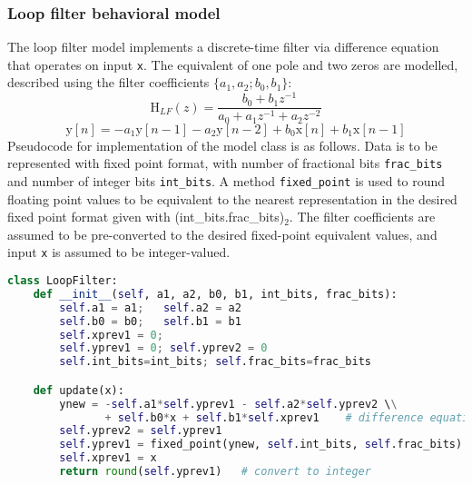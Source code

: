 \subsubsection{Loop filter behavioral model}
The loop filter model implements a discrete-time filter via difference equation that operates on input \texttt{x}. The equivalent of one pole and two zeros are modelled, described using the filter coefficients $\{a_1, a_2; b_0, b_1\}$:
\begin{equation}
\text{H}_{LF}(z) = \frac{b_0 + b_1z^{-1}}{a_0 + a_1z^{-1} + a_2z^{-2}}
\end{equation}
\begin{equation}
\text{y}[n] = -a_1 \text{y}[n-1]-a_2 \text{y}[n-2] + b_0\text{x}[n] + b_1\text{x}[n-1]
\end{equation}
Pseudocode for implementation of the model class is as follows. Data is to be represented with fixed point format, with number of fractional bits \texttt{frac\_bits} and number of integer bits \texttt{int\_bits}. A method \texttt{fixed\_point} is used to round floating point values to be equivalent to the nearest representation in the desired fixed point format given with (int\_bits.frac\_bits)$_2$. The filter coefficients are assumed to be pre-converted to the desired fixed-point equivalent values, and input \texttt{x} is assumed to be integer-valued.
\begin{lstlisting}[language={Python}, caption={Loop filter behavioral model.}, label={lf_code}]
class LoopFilter:
	def __init__(self, a1, a2, b0, b1, int_bits, frac_bits):
		self.a1 = a1;	self.a2 = a2
		self.b0 = b0;	self.b1 = b1
		self.xprev1 = 0;	
		self.yprev1 = 0; self.yprev2 = 0
		self.int_bits=int_bits;	self.frac_bits=frac_bits

	def update(x):
		ynew = -self.a1*self.yprev1 - self.a2*self.yprev2 \\
			   + self.b0*x + self.b1*self.xprev1	# difference equation
		self.yprev2 = self.yprev1	
		self.yprev1 = fixed_point(ynew, self.int_bits, self.frac_bits)
		self.xprev1 = x
		return round(self.yprev1)	# convert to integer
\end{lstlisting}

